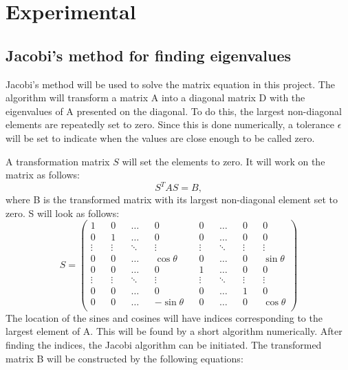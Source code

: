 \documentclass[10pt,a4paper,titlepage]{article}
\begin{document}
\section{Experimental}
\subsection{Jacobi's method for finding eigenvalues}
Jacobi's method will be used to solve the matrix equation in this project. The algorithm will transform a matrix A into a diagonal matrix D with the eigenvalues of A presented on the diagonal. To do this, the largest non-diagonal elements are repeatedly set to zero. Since this is done numerically, a tolerance $\epsilon$ will be set to indicate when the values are close enough to be called zero. 

A transformation matrix $S$ will set the elements to zero. It will work on the matrix as follows:
\begin{equation}
S^{T}AS=B,
\end{equation}
where B is the transformed matrix with its largest non-diagonal element set to zero. S will look as follows:
\setcounter{MaxMatrixCols}{20}
\begin{equation}
S=\begin{pmatrix} 
1	&&0	&&\hdots	&&0	&&0	&&\hdots	&&0 	&&0\\
0	&&1		&&\hdots&&0&&0&&\hdots&&0&&0\\ \vdots&&\vdots&&\ddots&&\vdots&&\vdots&&\ddots&&\vdots&&\vdots\\ 0&&0&&\hdots&&\cos\theta&&0&&\hdots&&0&&\sin\theta\\
0&&0&&\hdots&&0&&1&&\hdots&&0&&0\\ \vdots&&\vdots&&\ddots&&\vdots&&\vdots&&\ddots&&\vdots&&\vdots\\ 0&&0&&\hdots&&0&&0&&\hdots&&1&&0\\
0&&0&&\hdots&&-\sin\theta&&0&&\hdots&&0&&\cos\theta\\
\end{pmatrix}
\end{equation}
The location of the sines and cosines will have indices corresponding to the largest element of A. This will be found by a short algorithm numerically. After finding the indices, the Jacobi algorithm can be initiated. The transformed matrix B will be constructed by the following equations:
\end{document}
